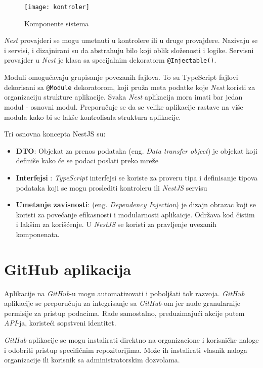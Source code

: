 \begin{figure}[h]
    \centering
    \texttt{[image: kontroler]}
    \caption{Komponente sistema}
    \label{fig:kontroler}
\end{figure}
  
\textit{Nest} provajderi se mogu umetnuti u kontrolere ili u druge provajdere. Nazivaju se i servisi, 
i dizajnirani su da abstrahuju bilo koji oblik složenosti i logike.
Servisni provajder u \textit{Nest} je klasa sa specijalnim dekoratorm \texttt{@Injectable()}. 

Moduli omogućavaju grupisanje povezanih fajlova. To su TypeScript fajlovi dekorisani sa 
\texttt{@Module} dekoratorom, koji pruža meta podatke koje \textit{Nest} koristi za organizaciju 
strukture aplikacije. Svaka \textit{Nest} aplikacija mora imati bar jedan modul - osnovni modul. 
Preporučuje se da se velike aplikacije rastave na više modula kako bi se lakše kontrolisala 
struktura aplikacije.

Tri osnovna koncepta NestJS su:
\begin{itemize}
\item \textbf{DTO}: Objekat za prenos podataka (eng. \textit{Data transfer object}) je objekat 
koji definiše kako će se podaci poslati preko mreže
\item \textbf{Interfejsi} : \textit{TypeScript} interfejsi se koriste za proveru tipa i 
definisanje tipova podataka koji se mogu proslediti kontroleru ili \textit{NestJS} servisu
\item \textbf{Umetanje zavisnosti}: (eng. \textit{Dependency Injection}) je dizajn obrazac 
koji se koristi za povećanje efikasnosti i modularnosti aplikaicje. Održava kod čistim i 
lakšim za korišćenje. U \textit{NestJS} se koristi za pravljenje uvezanih komponenata.~\cite{nest_getting_started}
\end{itemize}

\section{GitHub aplikacija}\label{sec:github_app}
Aplikacije na \textit{GitHub}-u mogu automatizovati i poboljšati tok razvoja. \textit{GitHub} 
aplikacije se preporučuju za integrisanje sa \textit{GitHub}-om jer nude granularnije permisije 
za pristup podacima. Rade samostalno, preduzimajući akcije putem \textit{API}-ja, koristeći 
sopstveni identitet. 

\textit{GitHub} aplikacije se mogu instalirati direktno na organizacione i korisničke naloge i 
odobriti pristup specifičnim repozitorijima. Može ih instalirati vlasnik naloga organizacije 
ili korisnik sa administratorskim dozvolama. 

